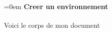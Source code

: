 \documentclass{article}
\begin{document}
\parindent=0em
\textbf{Creer un environnement} \\ \\
Voici le corps de mon document
\end{document}
